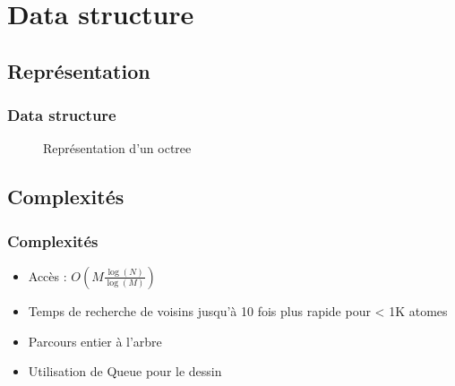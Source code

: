 \section{Data structure}

\subsection{Représentation}
{
\logo{}
\begin{frame}
\frametitle{Data structure}
\begin{figure}[h!]
    \caption{Représentation d'un octree}
\end{figure}
\end{frame}
}

\subsection{Complexités}
\begin{frame}
\frametitle{Complexités}
\begin{itemize}
    \itemsep1.5em
    \item Accès : $O(M\frac{\log(N)}{\log(M)})$
    \item Temps de recherche de voisins jusqu'à 10 fois plus rapide pour < 1K
        atomes
    \item Parcours entier à l'arbre
    \item Utilisation de Queue pour le dessin
\end{itemize}
\end{frame}
